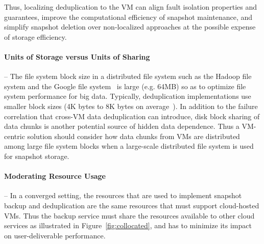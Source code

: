{%

Thus,
localizing deduplication to the VM can align fault isolation properties and
guarantees, improve the computational efficiency of snapshot maintenance, and
simplify snapshot deletion over non-localized approaches at the possible
expense of storage efficiency.

\paragraph*{Units of Storage versus Units of Sharing} --
The file system block  size in a distributed file system such as  
the Hadoop file system and the Google file system~\cite{googlefs03}
is large (e.g.  64MB) so as to optimize file system performance
for big data.
Typically, deduplication implementations use smaller block sizes (4K bytes to
8K bytes on average~\cite{Jin2009}).
In addition to the failure correlation that cross-VM data deduplication can
introduce, disk block sharing of data chunks is another potential source of
hidden data dependence.
Thus a VM-centric solution should consider how data chunks from VMs are
distributed among large file system blocks when a large-scale distributed file
system is used for snapshot storage.

 

\paragraph*{Moderating Resource Usage} --
In a converged setting, the resources that are used to implement snapshot
backup and deduplication are the same resources that must support cloud-hosted
VMs.  Thus the backup service must share the resources available to
other cloud services as illustrated in Figure~\ref{fig:collocated},
and has to minimize its impact on user-deliverable performance.

}

